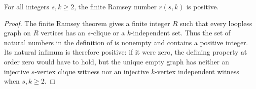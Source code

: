 \begin{lemma}
For all integers $s,k\geq2$, the finite Ramsey number $r(s,k)$ is positive.
\end{lemma}
\begin{proof}
The finite Ramsey theorem gives a finite integer $R$ such that every loopless
graph on $R$ vertices has an $s$-clique or a $k$-independent set.  Thus the
set of natural numbers in the definition of  is
nonempty and contains a positive integer.  Its natural infimum is therefore
positive: if it were zero, the defining property at order zero would have to
hold, but the unique empty graph has neither an injective $s$-vertex clique
witness nor an injective $k$-vertex independent witness when $s,k\geq2$.
\end{proof}

